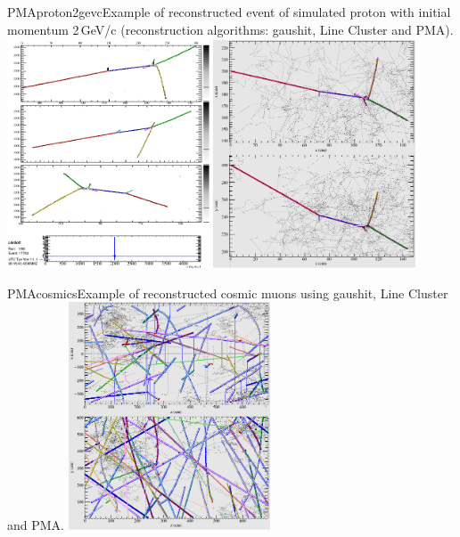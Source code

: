 \begin{cdrfigure}{PMAproton2gevc}{Example of reconstructed event of simulated proton with initial momentum 2\,GeV/c (reconstruction algorithms: gaushit, Line Cluster and PMA).}
\includegraphics[width=0.45\textwidth]{figures/evdtwqproj117703.png}
\includegraphics[width=0.45\textwidth]{figures/evdlarortho3d117703.png}
\end{cdrfigure}
\begin{cdrfigure}{PMAcosmics}{Example of reconstructed cosmic muons using gaushit, Line Cluster and PMA.}
\includegraphics[width=0.45\textwidth]{figures/evdlarortho3d11302.png}
\end{cdrfigure}




